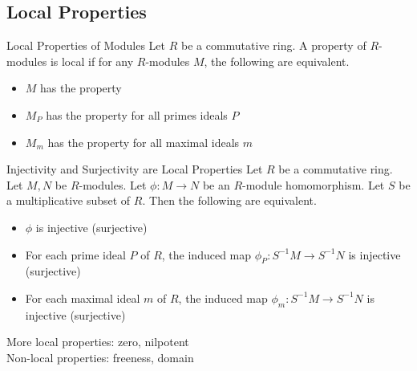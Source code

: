 \documentclass[a4paper]{article}
\begin{document}
\subsection{Local Properties}
\begin{defn}{Local Properties of Modules}{} Let $R$ be a commutative ring. A property of $R$-modules is local if for any $R$-modules $M$, the following are equivalent. 
\begin{itemize}
\item $M$ has the property
\item $M_P$ has the property for all primes ideals $P$
\item $M_m$ has the property for all maximal ideals $m$
\end{itemize}
\end{defn}

\begin{prp}{Injectivity and Surjectivity are Local Properties}{} Let $R$ be a commutative ring. Let $M,N$ be $R$-modules. Let $\phi:M\to N$ be an $R$-module homomorphism. Let $S$ be a multiplicative subset of $R$. Then the following are equivalent. 
\begin{itemize}
\item $\phi$ is injective (surjective)
\item For each prime ideal $P$ of $R$, the induced map $\phi_P:S^{-1}M\to S^{-1}N$ is injective (surjective)
\item For each maximal ideal $m$ of $R$, the induced map $\phi_m:S^{-1}M\to S^{-1}N$ is injective (surjective)
\end{itemize}
\end{prp}

More local properties: zero, nilpotent\\
Non-local properties: freeness, domain
\end{document}
